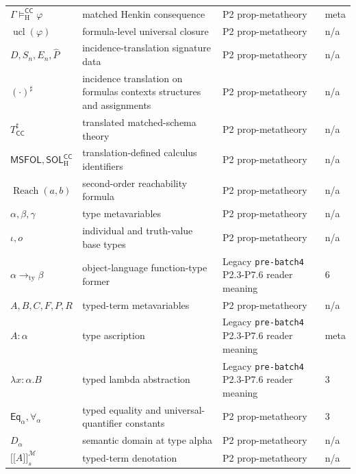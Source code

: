 \begin{longtable}{@{}p{}p{}p{}p{}@{}}
\(\Gamma\models_{\mathrm H}^{\mathsf{CC}}\varphi\) & matched Henkin consequence & P2 prop-\allowbreak{}metatheory & meta \\
\(\operatorname{ucl}(\varphi)\) & formula-level universal closure & P2 prop-\allowbreak{}metatheory & n/a \\
\(D,\allowbreak S_n,\allowbreak E_n,\allowbreak \widehat P\) & incidence-translation signature data & P2 prop-\allowbreak{}metatheory & n/a \\
\((\cdot)^\sharp\) & incidence translation on formulas contexts structures and assignments & P2 prop-\allowbreak{}metatheory & n/a \\
\(T_{\mathsf{CC}}^\sharp\) & translated matched-schema theory & P2 prop-\allowbreak{}metatheory & n/a \\
\(\mathsf{MSFOL},\allowbreak \mathsf{SOL}_{\mathrm H}^{\mathsf{CC}}\) & translation-defined calculus identifiers & P2 prop-\allowbreak{}metatheory & n/a \\
\(\operatorname{Reach}(a,\allowbreak b)\) & second-order reachability formula & P2 prop-\allowbreak{}metatheory & n/a \\
\(\alpha,\allowbreak \beta,\allowbreak \gamma\) & type metavariables & P2 prop-\allowbreak{}metatheory & n/a \\
\(\iota,\allowbreak o\) & individual and truth-value base types & P2 prop-\allowbreak{}metatheory & n/a \\
\(\alpha\to_{\mathrm{ty}}\beta\) & object-language function-type former & Legacy \texttt{pre-\allowbreak{}batch4} P2.\allowbreak{}3-\allowbreak{}P7.\allowbreak{}6 reader meaning & 6 \\
\(A,\allowbreak B,\allowbreak C,\allowbreak F,\allowbreak P,\allowbreak R\) & typed-term metavariables & P2 prop-\allowbreak{}metatheory & n/a \\
\(A:\alpha\) & type ascription & Legacy \texttt{pre-\allowbreak{}batch4} P2.\allowbreak{}3-\allowbreak{}P7.\allowbreak{}6 reader meaning & meta \\
\(\lambda x{:}\alpha.B\) & typed lambda abstraction & Legacy \texttt{pre-\allowbreak{}batch4} P2.\allowbreak{}3-\allowbreak{}P7.\allowbreak{}6 reader meaning & 3 \\
\(\mathsf{Eq}_{\alpha},\allowbreak \forall_{\alpha}\) & typed equality and universal-quantifier constants & P2 prop-\allowbreak{}metatheory & 3 \\
\(D_\alpha\) & semantic domain at type alpha & P2 prop-\allowbreak{}metatheory & n/a \\
\(\lbrack\!\lbrack A\rbrack\!\rbrack_s^{\mathcal M}\) & typed-term denotation & P2 prop-\allowbreak{}metatheory & n/a \\

\end{longtable}
